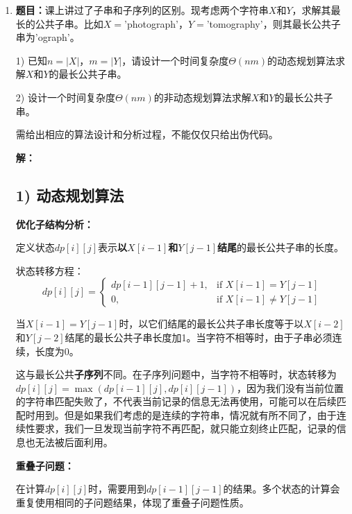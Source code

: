 \documentclass[UTF8,12pt,a4paper]{ctexart}
\begin{document}
\begin{enumerate}[1.]
	\textbf{时间复杂度分析：}

	算法需要填充一个$n \times \text{sum}/2$的动态规划表。每个状态的计算时间为$O(1)$。因此，总时间复杂度为$O(n \cdot \text{sum}/2)$。

	\textbf{空间复杂度分析：}

	需要维护一个维度为$n \times \text{sum}/2$的动态规划表，因此空间复杂度为$O(n \cdot \text{sum}/2)$。

	\newpage

	\item \textbf{题目：}课上讲过了子串和子序列的区别。现考虑两个字符串$X$和$Y$，求解其最长的公共子串。比如$X=$'photograph'，$Y=$'tomography'，则其最长公共子串为'ograph'。
	
	1) 已知$n=|X|$，$m=|Y|$，请设计一个时间复杂度$\Theta(nm)$的动态规划算法求解$X$和$Y$的最长公共子串。

	2) 设计一个时间复杂度$\Theta(nm)$的非动态规划算法求解$X$和$Y$的最长公共子串。

	需给出相应的算法设计和分析过程，不能仅仅只给出伪代码。

	\textbf{解：}

	\subsection*{1) 动态规划算法}

	\textbf{优化子结构分析：}

	定义状态$dp[i][j]$表示\textbf{以$X[i-1]$和$Y[j-1]$结尾}的最长公共子串的长度。

	状态转移方程：
	$$dp[i][j] = \begin{cases}
		dp[i-1][j-1] + 1, & \text{if } X[i-1] = Y[j-1] \\
		0, & \text{if } X[i-1] \neq Y[j-1]
	\end{cases}$$

	当$X[i-1] = Y[j-1]$时，以它们结尾的最长公共子串长度等于以$X[i-2]$和$Y[j-2]$结尾的最长公共子串长度加1。当字符不相等时，由于子串必须连续，长度为0。

	这与最长公共\textbf{子序列}不同。在子序列问题中，当字符不相等时，状态转移为$dp[i][j] = \max(dp[i-1][j], dp[i][j-1])$，因为我们没有当前位置的字符串匹配失败了，不代表当前记录的信息无法再使用，可能可以在后续匹配时用到。但是如果我们考虑的是连续的字符串，情况就有所不同了，由于连续性要求，我们一旦发现当前字符不再匹配，就只能立刻终止匹配，记录的信息也无法被后面利用。

	\textbf{重叠子问题：}

	在计算$dp[i][j]$时，需要用到$dp[i-1][j-1]$的结果。多个状态的计算会重复使用相同的子问题结果，体现了重叠子问题性质。


\end{enumerate}
\end{document}
